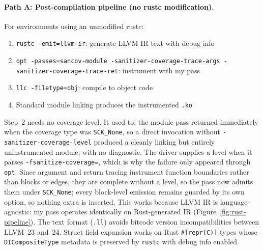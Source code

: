 \documentclass{article}
\begin{document}
\paragraph{Path A: Post-compilation pipeline (no rustc modification).}
For environments using an unmodified rustc:
\begin{enumerate}[nosep]
  \item \texttt{rustc --emit=llvm-ir}: generate LLVM IR text with debug info
  \item \texttt{opt -passes=sancov-module -sanitizer-coverage-trace-args
        -sanitizer-coverage-trace-ret}: instrument with my pass
  \item \texttt{llc -filetype=obj}: compile to object code
  \item Standard module linking produces the instrumented \texttt{.ko}
\end{enumerate}
Step~2 needs no coverage level. It used to: the module pass returned
immediately when the coverage type was \texttt{SCK\_None}, so a direct
invocation without \texttt{-sanitizer-coverage-level} produced a cleanly
linking but entirely uninstrumented module, with no diagnostic. The driver
supplies a level when it parses \texttt{-fsanitize-coverage=}, which is why the
failure only appeared through \texttt{opt}. Since argument and return tracing
instrument function boundaries rather than blocks or edges, they are complete
without a level, so the pass now admits them under \texttt{SCK\_None}; every
block-level emission remains guarded by its own option, so nothing extra is
inserted.
This works because LLVM IR is language-agnostic: my pass operates identically
on Rust-generated IR (Figure~\ref{fig:rust-pipeline}). The text format (\texttt{.ll}) avoids bitcode version
incompatibilities between LLVM~23 and~24. Struct field expansion works on Rust
\texttt{\#[repr(C)]} types whose \texttt{DICompositeType} metadata is preserved
by \texttt{rustc} with debug info enabled.
\end{document}
